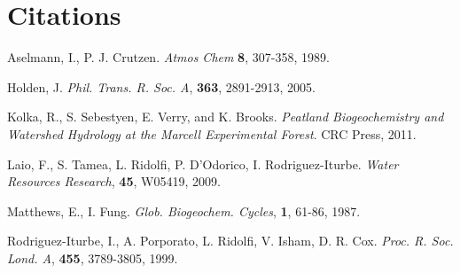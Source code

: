 \documentclass{beamer}
\begin{document}


\section{Citations} 
\begin{frame}
\begin{thebibliography}{9}
\footnotesize{
Aselmann, I., P. J. Crutzen. \textit{Atmos Chem} \textbf{8}, 307-358, 1989.

Holden, J.
\textit{Phil. Trans. R. Soc. A}, \textbf{363}, 2891-2913, 2005.

Kolka, R., S. Sebestyen, E. Verry, and K. Brooks. \textit{Peatland Biogeochemistry and Watershed Hydrology at the  Marcell Experimental Forest}.
CRC Press,
2011. %

Laio, F., S. Tamea, L. Ridolfi, P. D'Odorico, I. Rodriguez-Iturbe.
\textit{Water Resources Research}, \textbf{45}, W05419, 2009.

Matthews, E., I. Fung. \textit{Glob. Biogeochem. Cycles}, \textbf{1}, 61-86, 1987.

Rodriguez-Iturbe, I., A. Porporato, L. Ridolfi, V. Isham, D. R. Cox.
\textit{Proc. R. Soc. Lond. A}, \textbf{455}, 3789-3805, 1999.
}
\end{thebibliography}
\end{frame}

\end{document}
